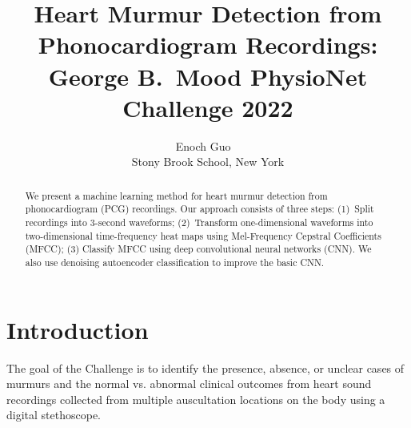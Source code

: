 \documentclass[twocolumn]{cinc}
\begin{document}


\title{Heart Murmur Detection from Phonocardiogram Recordings: \\
George B.\ Mood PhysioNet Challenge 2022}


\author {Enoch Guo
\ \\ %
  Stony Brook School, New York}

\maketitle
\begin{abstract}

We present a machine learning method for heart murmur detection from phonocardiogram (PCG) recordings. Our approach consists of three steps: (1)~Split recordings into 3-second waveforms; (2)~Transform one-dimensional waveforms into two-dimensional time-frequency heat maps using Mel-Frequency Cepstral Coefficients (MFCC); (3) Classify MFCC using deep convolutional neural networks (CNN). We also use denoising autoencoder classification to improve the basic CNN.

\end{abstract}

\section{Introduction}

The goal of the Challenge is to identify the presence, absence, or unclear cases of murmurs and the normal vs. abnormal clinical outcomes from heart sound recordings collected from multiple auscultation locations on the body using a digital stethoscope.

\end{document}

